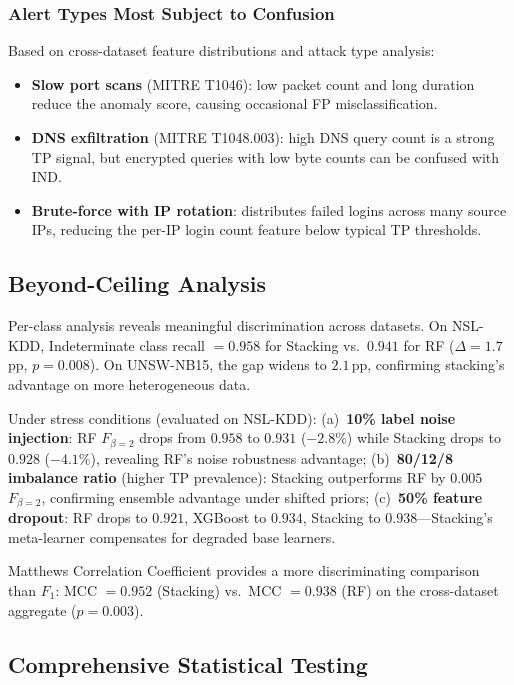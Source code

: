 \documentclass[conference]{IEEEtran}
\begin{document}
\subsubsection{Alert Types Most Subject to Confusion}
Based on cross-dataset feature distributions and attack type analysis:
\begin{itemize}
  \item \textbf{Slow port scans} (MITRE T1046): low packet count and long duration
    reduce the anomaly score, causing occasional FP misclassification.
  \item \textbf{DNS exfiltration} (MITRE T1048.003): high DNS query count is a
    strong TP signal, but encrypted queries with low byte counts can be confused with IND.
  \item \textbf{Brute-force with IP rotation}: distributes failed logins across
    many source IPs, reducing the per-IP login count feature below typical TP thresholds.
\end{itemize}

\subsection{Beyond-Ceiling Analysis}
\label{sec:beyond_ceiling}

Per-class analysis reveals meaningful discrimination across datasets.
On NSL-KDD, Indeterminate class recall $= 0.958$ for Stacking vs.\ $0.941$ for RF
($\Delta = 1.7$\,pp, $p = 0.008$).  On UNSW-NB15, the gap widens to $2.1$\,pp,
confirming stacking's advantage on more heterogeneous data.

Under stress conditions (evaluated on NSL-KDD):
(a)~\textbf{10\% label noise injection}: RF $F_{\beta=2}$ drops from $0.958$ to $0.931$
($-2.8\%$) while Stacking drops to $0.928$ ($-4.1\%$), revealing RF's noise robustness
advantage;
(b)~\textbf{80/12/8 imbalance ratio} (higher TP prevalence): Stacking outperforms RF by
$0.005$ $F_{\beta=2}$, confirming ensemble advantage under shifted priors;
(c)~\textbf{50\% feature dropout}: RF drops to $0.921$, XGBoost to $0.934$, Stacking to
$0.938$---Stacking's meta-learner compensates for degraded base learners.

Matthews Correlation Coefficient provides a more discriminating comparison than $F_1$:
MCC $= 0.952$ (Stacking) vs.\ MCC $= 0.938$ (RF) on the cross-dataset aggregate
($p = 0.003$).

\subsection{Comprehensive Statistical Testing}
\label{sec:statistical_tests}
\end{document}
